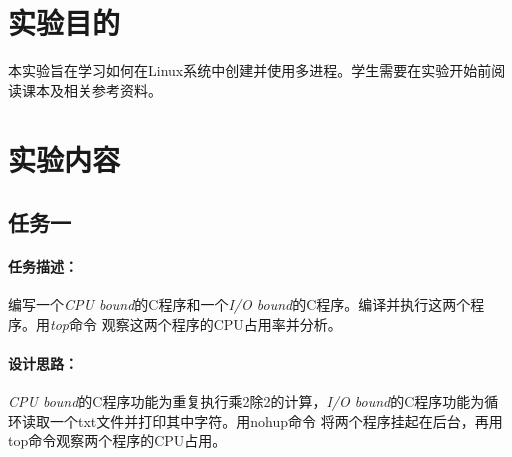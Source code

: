 \documentclass{article}
\begin{document}
    \section{实验目的}
    本实验旨在学习如何在Linux系统中创建并使用多进程。学生需要在实验开始前阅读课本及相关参考资料。
    \section{实验内容}
    \subsection{任务一}
    \paragraph{任务描述：}\quad\par
    编写一个\textit{CPU bound}的C程序和一个\textit{I/O bound}的C程序。编译并执行这两个程序。用\textit{top}命令
    观察这两个程序的CPU占用率并分析。
    \paragraph{设计思路：}\quad\par
    \textit{CPU bound}的C程序功能为重复执行乘2除2的计算，\textit{I/O bound}的C程序功能为循环读取一个txt文件并打印其中字符。用nohup命令
    将两个程序挂起在后台，再用top命令观察两个程序的CPU占用。
\end{document}
